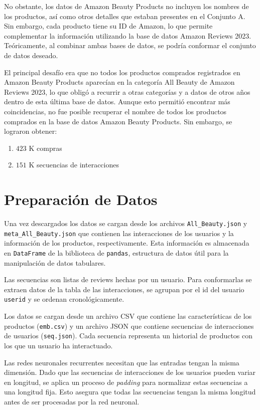 \documentclass[runningheads]{llncs}
\begin{document}
No obstante, los datos de Amazon Beauty Products no incluyen los nombres de los productos, así como otros detalles que estaban presentes en el Conjunto A. Sin embargo, cada producto tiene su ID de Amazon, lo que permite complementar la información utilizando la base de datos Amazon Reviews 2023. Teóricamente, al combinar ambas bases de datos, se podría conformar el conjunto de datos deseado.

El principal desafío era que no todos los productos comprados registrados en Amazon Beauty Products aparecían en la categoría All Beauty de Amazon Reviews 2023, lo que obligó a recurrir a otras categorías y a datos de otros años dentro de esta última base de datos. Aunque esto permitió encontrar más coincidencias, no fue posible recuperar el nombre de todos los productos comprados en la base de datos Amazon Beauty Products. Sin embargo, se lograron obtener:
\begin{enumerate}
	\item $423$ K compras
	\item $151$ K secuencias de interacciones
\end{enumerate}

\section{Preparación de Datos}

Una vez descargados los datos se cargan desde los archivos \texttt{All\_Beauty.json} y \texttt{meta\_All\_Beauty.json} que contienen las interacciones de los usuarios y la información de los productos, respectivamente. Esta información es almacenada en \texttt{DataFrame} de la biblioteca de \texttt{pandas}, estructura de datos \'util para la manipulaci\'on de datos tabulares.

Las secuencias son listas de reviews hechas por un usuario. Para conformarlas se extraen datos de la tabla de las interacciones, se agrupan por el id del usuario \texttt{userid} y se ordenan cronol\'ogicamente.

Los datos se cargan desde un archivo CSV que contiene las características de los productos (\texttt{emb.csv}) y un archivo JSON que contiene secuencias de interacciones de usuarios (\texttt{seq.json}). Cada secuencia representa un historial de productos con los que un usuario ha interactuado. 

Las redes neuronales recurrentes necesitan que las entradas tengan la misma dimensión. Dado que las secuencias de interacciones de los usuarios pueden variar en longitud, se aplica un proceso de \textit{padding} para normalizar estas secuencias a una longitud fija. Esto asegura que todas las secuencias tengan la misma longitud antes de ser procesadas por la red neuronal.
\end{document}
